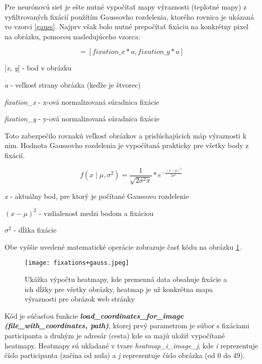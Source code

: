Pre neurónovú sieť je ešte nutné vypočítať mapy výraznosti (teplotné mapy) z vyfiltrovaných fixácií použítím Gaussovho rozdelenia, ktorého rovnica je ukázaná vo vzorci \ref{gauss}. Najprv však bolo nutné prepočítať fixáciu na konkrétny pixel na obrázku, pomocou nasledujúceho vzorca:

\begin{equation}
[x, y] = [fixation\_x * a, fixation\_y * a]
\label{fixation_convert}
\end{equation}

[\textit{x, y}] - bod v obrázku

\textit{a} - veľkosť strany obrázka (keďže je štvorec)

\textit{fixation\_x} - x-ová normalizovaná súradnica fixácie

\textit{fixation\_y} - y-ová normalizovaná súradnica fixácie
\newline

Toto zabezpečilo rovnakú veľkosť obrázkov a prislúchajúcich máp výraznosti k nim. Hodnota Gaussovho rozdelenia je vypočítaná prakticky pre všetky body z fixácií. 

\begin{equation}
f (x \mid  \mu, \sigma^2 ) = \frac{1}{\sqrt {2 \sigma^2 \pi}} * e^{-\frac{(x- \mu )^2}{2\sigma^2}}
\label{gauss}
\end{equation}

\textit{x} - aktuálny bod, pre ktorý je počítané Gaussovo rozdelenie

\((x - \mu )^{2}\) - vzdialenosť medzi bodom a fixáciou

\(\sigma^2\) - dĺžka fixácie
\newline

Obe vyššie uvedené matematické operácie zobrazuje časť kódu na obrázku \ref{fig:fix_gauss_code}.

	\begin{figure}[H]
		
		\begin{center}
			\texttt{[image: fixations+gauss.jpeg]}
		\end{center}
		\caption[Ukážka výpočtu heatmapy]{Ukážka výpočtu heatmapy, kde premenná data obsahuje fixácie a ich dĺžky pre všetky obrázky, heatmap je už konkrétna mapa výraznosti pre obrázok web stránky}
		\label{fig:fix_gauss_code}
	\end{figure}

Kód je súčasťou funkcie \textit{\textbf{load\_coordinates\_for\_image (file\_with\_coordinates, path)}}, ktorej prvý parametrom je súbor s fixáciami participanta a druhým je adresár (cesta) kde sa majú uložiť vypočítané heatmapy. Heatmapy sú ukladané v tvare \textit{heatmap\_i\_image\_j}, kde \textit{i} reprezentuje číslo participanta (začína od nula) a \textit{j} reprezentuje číslo obrázka (od 0 do 49). 

